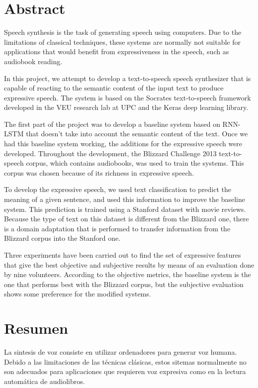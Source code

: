 \chapter*{Abstract}

Speech synthesis is the task of generating speech using computers. Due to the limitations of classical techniques, these systems are normally not suitable for applications that would benefit from expressiveness in the speech, such as audiobook reading.

In this project, we attempt to develop a text-to-speech speech synthesizer that is capable of reacting to the semantic content of the input text to produce expressive speech. The system is based on the Socrates text-to-speech framework developed in the VEU research lab at UPC and the Keras deep learning library.

The first part of the project was to develop a baseline system based on RNN-LSTM that doesn't take into account the semantic content of the text. Once we had this baseline system working, the additions for the expressive speech were developed. Throughout the development, the Blizzard Challenge 2013 text-to-speech corpus, which contains audiobooks, was used to train the systems. This corpus was chosen because of its richness in expressive speech.

To develop the expressive speech, we used text classification to predict the meaning of a given sentence, and used this information to improve the baseline system. This prediction is trained using a Stanford dataset with movie reviews. Because the type of text on this dataset is different from the Blizzard one, there is a domain adaptation that is performed to transfer information from the Blizzard corpus into the Stanford one.

Three experiments have been carried out to find the set of expressive features that give the best objective and subjective results by means of an evaluation done by nine volunteers. According to the objective metrics, the baseline system is the one that performs best with the Blizzard corpus, but the subjective evaluation shows some preference for the modified systems.

\chapter*{Resumen}

La sintesis de voz consiste en utilizar ordenadores para generar voz humana. Debido a las limitaciones de las técnicas clásicas, estos sitemas normalmente no son adecuados para aplicaciones que requieren voz expresiva como en la lectura automática de audiolibros.

